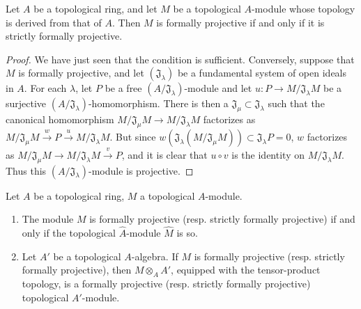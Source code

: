 \begin{proposition}[19.2.4]
\label{0.19.2.4}
Let $A$ be a topological ring, and let $M$ be a topological $A$-module whose topology is derived from that of $A$.
Then $M$ is formally projective if and only if it is strictly formally projective.
\end{proposition}


\begin{proof}
We have just seen that the condition is sufficient.
Conversely, suppose that $M$ is formally projective, and let $(\mathfrak J_\lambda)$ be a fundamental system of open ideals in $A$.
For each $\lambda$, let $P$ be a free $(A/\mathfrak J_\lambda)$-module and let $u:P\to M/\mathfrak J_\lambda M$ be a surjective $(A/\mathfrak J_\lambda)$-homomorphism.
There is then a $\mathfrak J_\mu\subset\mathfrak J_\lambda$ such that the canonical homomorphism $M/\mathfrak J_\mu M\to M/\mathfrak J_\lambda M$ factorizes as $M/\mathfrak J_\mu M\xrightarrow{w}P\xrightarrow{u}M/\mathfrak J_\lambda M$.
But since $w(\mathfrak J_\lambda(M/\mathfrak J_\mu M))\subset\mathfrak J_\lambda P=0$, $w$ factorizes as $M/\mathfrak J_\mu M\to M/\mathfrak J_\lambda M\xrightarrow{v}P$, and it is clear that $u\circ v$ is the identity on $M/\mathfrak J_\lambda M$.
Thus this $(A/\mathfrak J_\lambda)$-module is projective.
\end{proof}

\begin{proposition}[19.2.5]
\label{0.19.2.5}
Let $A$ be a topological ring, $M$ a topological $A$-module.
\begin{enumerate}
  \item[\textup{(i)}] The module $M$ is formally projective \textup{(resp.} strictly formally projective\textup{)} if and only if the topological $\widehat A$-module $\widehat M$ is so.
  \item[\textup{(ii)}] Let $A'$ be a topological $A$-algebra.
  If $M$ is formally projective \textup{(resp.} strictly formally projective\textup{)}, then $M\otimes_A A'$, equipped with the tensor-product topology, is a formally projective \textup{(resp.} strictly formally projective\textup{)} topological $A'$-module.
\end{enumerate}
\end{proposition}

